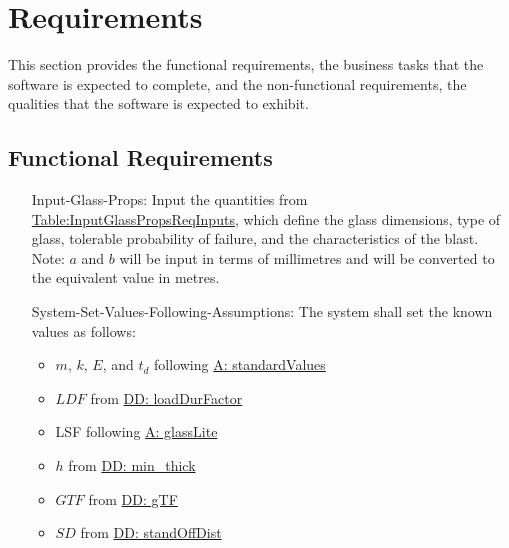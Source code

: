 \documentclass[12pt]{article}
\begin{document}
\section{Requirements}
\label{Sec:Requirements}
This section provides the functional requirements, the business tasks that the software is expected to complete, and the non-functional requirements, the qualities that the software is expected to exhibit.
\subsection{Functional Requirements}
\label{Sec:FRs}
\begin{itemize}
\item[Input-Glass-Props:\phantomsection\label{inputGlassProps}]Input the quantities from \hyperref[Table:InputGlassPropsReqInputs]{Table:InputGlassPropsReqInputs}, which define the glass dimensions, type of glass, tolerable probability of failure, and the characteristics of the blast. Note: $a$ and $b$ will be input in terms of millimetres and will be converted to the equivalent value in metres.
\item[System-Set-Values-Following-Assumptions:\phantomsection\label{sysSetValsFollowingAssumps}]The system shall set the known values as follows:
                                                                                                \begin{itemize}
                                                                                                \item{$m$, $k$, $E$, and ${t_{d}}$ following \hyperref[A:standardValues]{A: standardValues}}
                                                                                                \item{$LDF$ from \hyperref[DD:loadDurFactor]{DD: loadDurFactor}}
                                                                                                \item{LSF following \hyperref[A:glassLite]{A: glassLite}}
                                                                                                \item{$h$ from \hyperref[DD:min.thick]{DD: min\_thick}}
                                                                                                \item{$GTF$ from \hyperref[DD:gTF]{DD: gTF}}
                                                                                                \item{$SD$ from \hyperref[DD:standOffDist]{DD: standOffDist}}

\end{itemize}
\end{itemize}
\end{document}

